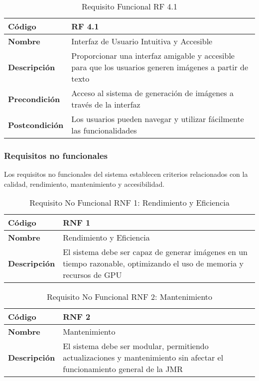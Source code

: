 \begin{table}[H] 
    \centering 
    \renewcommand{\arraystretch}{1.5} 
    \begin{tabular}{|l|p{12cm}|} 
        \hline \rowcolor{gray!30}
        \textbf{Código} & \textbf{RF 4.1} \\ 
        \hline 
        \textbf{Nombre} & Interfaz de Usuario Intuitiva y Accesible \\
        \hline
        \textbf{Descripción} & Proporcionar una interfaz amigable y accesible para que los usuarios generen imágenes a partir de texto
        \\ \hline \textbf{Precondición} & Acceso al sistema de generación de imágenes a través de la interfaz \\ 
        \hline \textbf{Postcondición} & Los usuarios pueden navegar y utilizar fácilmente las funcionalidades \\
        \hline 
    \end{tabular}
    \caption{Requisito Funcional RF 4.1}
    \label{tab:reqfun4}
\end{table}


\subsubsection{Requisitos no funcionales}
Los requisitos no funcionales del sistema establecen criterios relacionados con la calidad, rendimiento, mantenimiento y accesibilidad.


\begin{table}[H] 
    \centering 
    \renewcommand{\arraystretch}{1.5} 
    \begin{tabular}{|l|p{12cm}|} 
        \hline \rowcolor{gray!30} 
        \textbf{Código} & \textbf{RNF 1} \\ 
        \hline 
        \textbf{Nombre} & Rendimiento y Eficiencia \\ 
        \hline \textbf{Descripción} & El sistema debe ser capaz de generar imágenes en un tiempo razonable, optimizando el uso de memoria y recursos de GPU \\ 
        \hline 
    \end{tabular} 
    \caption{Requisito No Funcional RNF 1: Rendimiento y Eficiencia} 
    \label{tab:reqnofun1} 
\end{table}
    
\begin{table}[H]
    \centering 
    \renewcommand{\arraystretch}{1.5} 
    \begin{tabular}{|l|p{12cm}|} 
        \hline \rowcolor{gray!30}
        \textbf{Código} & \textbf{RNF 2} \\ 
        \hline 
        \textbf{Nombre} & Mantenimiento \\ 
        \hline 
        \textbf{Descripción} & El sistema debe ser modular, permitiendo actualizaciones y mantenimiento sin afectar el funcionamiento general de la JMR \\ 
        \hline 
    \end{tabular} 
    \caption{Requisito No Funcional RNF 2: Mantenimiento} 
    \label{tab:reqnofun2}
\end{table}

